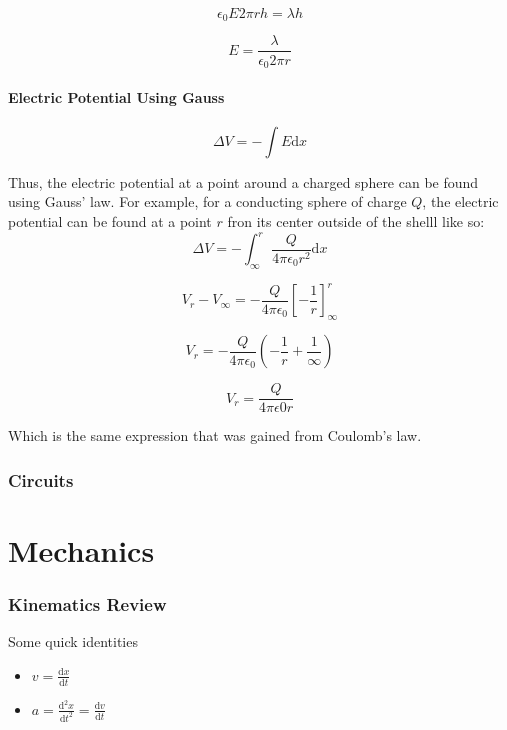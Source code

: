 \documentclass[a4paper,12pt]{article}
\begin{document}
					\begin{equation*}
							\epsilon_{0} E 2 \pi r h = \lambda h 
					\end{equation*}

					\begin{equation*}
							E = \frac{\lambda}{\epsilon_{0} 2 \pi r}
					\end{equation*}
				
				\subsection{Electric Potential Using Gauss}
					\begin{equation*}
							\Delta V = -\int E \mathrm{d}x 
					\end{equation*}

						Thus, the electric potential at a point around a charged sphere can be found using Gauss' law. For example, for a conducting sphere of charge $Q$, the electric potential can be found at a point  $r$ fron its center outside of the shelll like so:							
						\begin{equation*}
								\Delta V =-\int_{\infty}^{r} \frac{Q}{4 \pi \epsilon_{0} r^{2}} \mathrm{d}x
						\end{equation*}

						\begin{equation*}
								V_{r} - V_{\infty} = -\frac{Q}{4 \pi \epsilon_{0}}\left[-\frac{1}{r}\right]_{\infty}^{r}
						\end{equation*}

						\begin{equation*}
								V_{r} = -\frac{Q}{4\pi \epsilon_{0}} \left(-\frac{1}{r} + \frac{1}{\infty}\right)
						\end{equation*}

						\begin{equation*}
								V_{r} = \frac{Q}{4\pi \epsilon{0} r}
						\end{equation*}

						Which is the same expression that was gained from Coulomb's law.
				\setcounter{subsubsection}{0}
			\setcounter{subsection}{0}

		\section{Circuits}

\setcounter{section}{0}
\setcounter{subsection}{0}
\setcounter{subsubsection}{0}
\newpage

\part{Mechanics}
		\section{Kinematics Review}
		Some quick identities
		\begin{itemize}
				\item $v = \frac{\mathrm{d}x}{\mathrm{d}t}$
				\item $a = \frac{\mathrm{d}^{2}x}{\mathrm{d}t^{2}} = \frac{\mathrm{d}v}{\mathrm{d}t}$
		\end{itemize}
\end{document}
